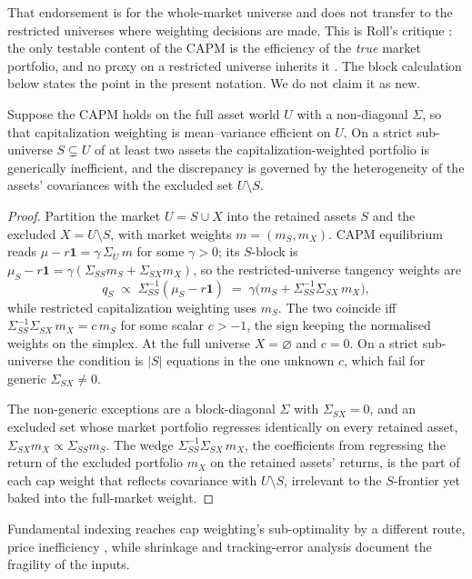 That endorsement is for the whole-market universe and does not transfer to the
restricted universes where weighting decisions are made. This is Roll's critique
\parencite{roll1977}: the only testable content of the CAPM is the efficiency of
the \emph{true} market portfolio, and no proxy on a restricted universe inherits it
\parencite{prono2009}. The block calculation below states the point in the present
notation. We do not claim it as new.

\begin{lemma}
\label{lem:restriction}
Suppose the CAPM holds on the full asset world $U$ with a non-diagonal $\Sigma$, so
that capitalization weighting is mean--variance efficient on $U$. On a strict
sub-universe $S \subsetneq U$ of at least two assets the capitalization-weighted portfolio is generically
inefficient, and the discrepancy is governed by the heterogeneity of the assets'
covariances with the excluded set $U \setminus S$.
\end{lemma}
\begin{proof}
Partition the market $U = S \cup X$ into the retained assets $S$ and the excluded
$X = U\setminus S$, with market weights $m = (m_S, m_X)$. CAPM equilibrium reads
$\mu - r\mathbf 1 = \gamma\,\Sigma_U\, m$ for some $\gamma > 0$; its $S$-block is
$\mu_S - r\mathbf 1 = \gamma(\Sigma_{SS} m_S + \Sigma_{SX} m_X)$, so the
restricted-universe tangency weights are
\begin{equation*}
  q_S \;\propto\; \Sigma_{SS}^{-1}(\mu_S - r\mathbf 1)
  \;=\; \gamma\big(m_S + \Sigma_{SS}^{-1}\Sigma_{SX}\, m_X\big),
\end{equation*}
while restricted capitalization weighting uses $m_S$. The two coincide iff
$\Sigma_{SS}^{-1}\Sigma_{SX}\, m_X = c\, m_S$ for some scalar $c > -1$, the sign
keeping the normalised weights on the simplex. At the full universe
$X = \varnothing$ and $c = 0$. On a strict sub-universe the condition is $|S|$
equations in the one unknown $c$, which fail for generic $\Sigma_{SX} \neq 0$.

The non-generic exceptions are a block-diagonal $\Sigma$ with $\Sigma_{SX} = 0$,
and an excluded set whose market portfolio regresses identically on every retained
asset, $\Sigma_{SX} m_X \propto \Sigma_{SS} m_S$. The wedge
$\Sigma_{SS}^{-1}\Sigma_{SX}\, m_X$, the coefficients from regressing the return of
the excluded portfolio $m_X$ on the retained assets' returns, is the part of each cap weight that reflects covariance
with $U\setminus S$, irrelevant to the $S$-frontier yet baked into the full-market
weight.
\end{proof}

Fundamental indexing reaches cap weighting's sub-optimality by a different route,
price inefficiency \parencite{hsu2006}, while shrinkage \parencite{ledoitwolf2004}
and tracking-error analysis \parencite{roll1992} document the fragility of the
inputs.
